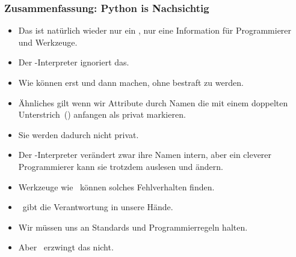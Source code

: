 \documentclass[aspectratio=169,mathserif,notheorems]{beamer}%
\begin{document}
%
\begin{frame}%
\frametitle{Zusammenfassung: Python is Nachsichtig}%
\begin{itemize}%
%
%
%
%
%
%
%
%
%
%
%
%
%
%
\item<8-> Das ist natürlich wieder nur ein , nur eine Information für Programmierer und Werkzeuge.%
%
\item<9-> Der \python-Interpreter ignoriert das.%
%
\item<10-> Wie können erst  und dann  machen, ohne bestraft zu werden.%
%
\item<11-> Ähnliches gilt wenn wir Attribute durch Namen die mit einem doppelten Unterstrich~(\pythonilIdx{\_\_}) anfangen als privat markieren.%
%
\item<12-> Sie werden dadurch nicht privat.%
%
\item<13-> Der \python-Interpreter verändert zwar ihre Namen intern\cite{PEP8}, aber ein cleverer Programmierer kann sie trotzdem auslesen und ändern.%
%
\item<14-> Werkzeuge wie \mypy\ können solches Fehlverhalten finden.%
%
\item<15-> \python\ gibt die Verantwortung in unsere Hände.%
%
\item<16-> Wir müssen uns an Standards und Programmierregeln halten.%
%
\item<17-> Aber \python\ erzwingt das nicht.%
\end{itemize}%
\end{frame}%
%
\endPresentation%
\end{document}
